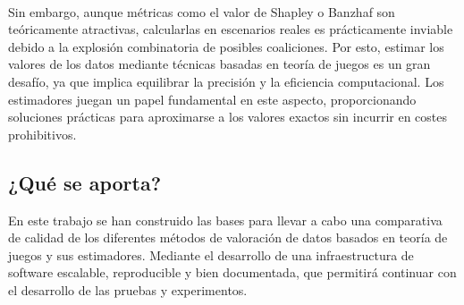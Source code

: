 \

Sin embargo, aunque métricas como el valor de Shapley o Banzhaf
son teóricamente atractivas, calcularlas en escenarios reales es
prácticamente inviable debido a la explosión combinatoria de
posibles coaliciones. Por esto, estimar los valores
de los datos mediante técnicas  basadas en teoría de juegos
es un gran desafío, ya que implica equilibrar la precisión y
la eficiencia computacional. Los estimadores juegan un papel
fundamental en este aspecto, proporcionando
soluciones prácticas para aproximarse a los valores
exactos sin incurrir en costes prohibitivos.


\subsection*{¿Qué se aporta?}
En este trabajo se han construido las bases para llevar
a cabo una comparativa de calidad de los diferentes métodos
de valoración de datos basados en teoría de juegos y sus
estimadores. Mediante
el desarrollo de una infraestructura de software
escalable, reproducible y bien documentada, que permitirá
continuar con el desarrollo de las pruebas y experimentos.


